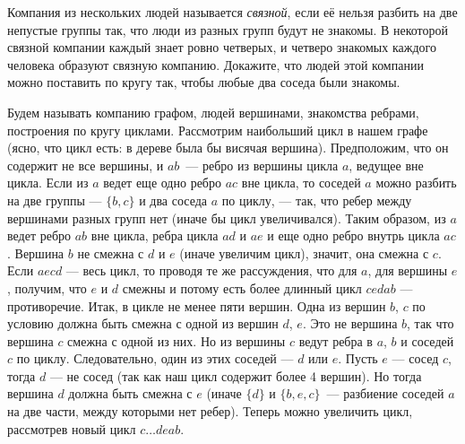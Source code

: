 Компания из нескольких людей называется \emph{связной}, если её нельзя разбить
на две непустые группы так, что люди из разных групп будут не знакомы.
В некоторой связной компании каждый знает ровно четверых, и четверо знакомых
каждого человека образуют связную компанию.
Докажите, что людей этой компании можно поставить по кругу так, чтобы любые два
соседа были знакомы.

\solution
Будем называть компанию графом, людей вершинами, знакомства ребрами, построения
по кругу циклами.
Рассмотрим наибольший цикл в нашем графе
(ясно, что цикл есть: в дереве была бы висячая вершина).
Предположим, что он содержит не все вершины, и $ab$~--- ребро из вершины цикла
$a$, ведущее вне цикла.
Если из $a$ ведет еще одно ребро $ac$ вне цикла, то соседей $a$ можно разбить
на две группы --- $\{b, c\}$ и два соседа $a$ по циклу, --- так, что ребер
между вершинами разных групп нет (иначе бы цикл увеличивался).
Таким образом, из $a$ ведет ребро $ab$ вне цикла, ребра цикла $ad$ и $ae$ и еще
одно ребро внутрь цикла $ac$.
Вершина $b$ не смежна с $d$ и $e$ (иначе увеличим цикл), значит, она смежна с
$c$.
Если $aecd$ --- весь цикл, то проводя те же рассуждения, что для $a$, для
вершины $e$, получим, что $e$ и $d$ смежны и потому есть более длинный цикл
$cedab$ --- противоречие.
Итак, в цикле не менее пяти вершин.
Одна из вершин $b$, $c$ по условию должна быть смежна с одной из вершин
$d$, $e$.
Это не вершина $b$, так что вершина $c$ смежна с одной из них.
Но из вершины $c$ ведут ребра в $a$, $b$ и соседей $c$ по циклу.
Следовательно, один из этих соседей --- $d$ или $e$.
Пусть $e$ --- сосед $c$, тогда $d$ --- не сосед
(так как наш цикл содержит более 4 вершин).
Но тогда вершина $d$ должна быть смежна с $e$ (иначе $\{d\}$ и $\{b,e,c\}$~---
разбиение соседей $a$ на две части, между которыми нет ребер).
Теперь можно увеличить цикл, рассмотрев новый цикл $c \ldots deab$. 
